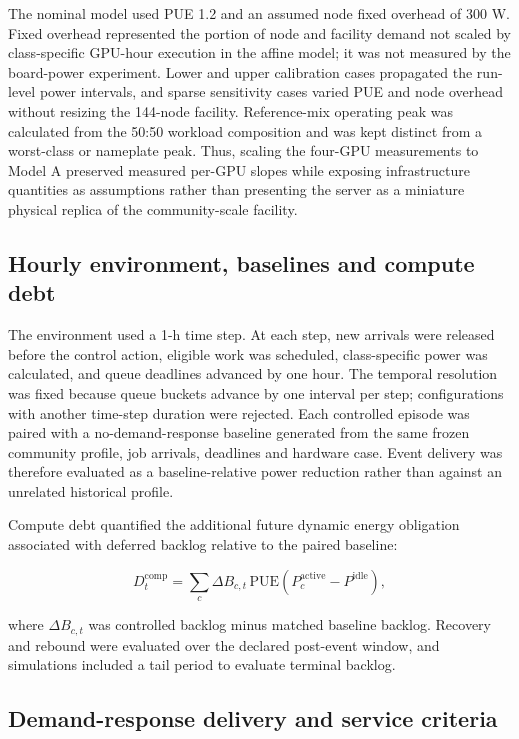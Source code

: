 \documentclass[10pt,a4paper]{article}
\begin{document}
The nominal model used PUE 1.2 and an assumed node fixed overhead of 300 W. Fixed overhead represented the portion of node and facility demand not scaled by class-specific GPU-hour execution in the affine model; it was not measured by the board-power experiment. Lower and upper calibration cases propagated the run-level power intervals, and sparse sensitivity cases varied PUE and node overhead without resizing the 144-node facility. Reference-mix operating peak was calculated from the 50:50 workload composition and was kept distinct from a worst-class or nameplate peak. Thus, scaling the four-GPU measurements to Model A preserved measured per-GPU slopes while exposing infrastructure quantities as assumptions rather than presenting the server as a miniature physical replica of the community-scale facility.


\subsection*{Hourly environment, baselines and compute debt}

The environment used a 1-h time step. At each step, new arrivals were released before the control action, eligible work was scheduled, class-specific power was calculated, and queue deadlines advanced by one hour. The temporal resolution was fixed because queue buckets advance by one interval per step; configurations with another time-step duration were rejected. Each controlled episode was paired with a no-demand-response baseline generated from the same frozen community profile, job arrivals, deadlines and hardware case. Event delivery was therefore evaluated as a baseline-relative power reduction rather than against an unrelated historical profile.


Compute debt quantified the additional future dynamic energy obligation associated with deferred backlog relative to the paired baseline:


\begin{equation*}
D^{\mathrm{comp}}_t=\sum_c \Delta B_{c,t}\,\mathrm{PUE}\left(P^{\mathrm{active}}_c-P^{\mathrm{idle}}\right),
\end{equation*}

where \(\Delta B_{c,t}\) was controlled backlog minus matched baseline backlog. Recovery and rebound were evaluated over the declared post-event window, and simulations included a tail period to evaluate terminal backlog.


\subsection*{Demand-response delivery and service criteria}
\end{document}
